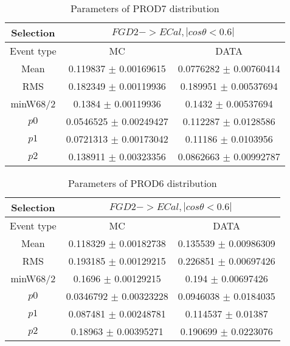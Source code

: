 \documentclass[a4paper,12pt]{article}
\begin{document}
\begin{table}[htbp]
\begin{center}
\begin{tabular}{|c|c|c|}
        \hline
        Selection & \multicolumn{2}{|c|}{$FGD2->ECal, |cos\theta<0.6|$}  \\ \hline
        Event type & MC & DATA \\ 
        \hline
        Mean & 0.119837 $\pm$ 0.00169615 & 0.0776282 $\pm$ 0.00760414 \\ 
        \hline 
        RMS & 0.182349 $\pm$ 0.00119936 & 0.189951 $\pm$ 0.00537694 \\ 
        \hline 
        minW68/2 & 0.1384 $\pm$ 0.00119936 & 0.1432 $\pm$ 0.00537694 \\ 
        \hline 
        $p0$ & 0.0546525 $\pm$ 0.00249427 & 0.112287 $\pm$ 0.0128586 \\ 
        \hline 
        $p1$ & 0.0721313 $\pm$ 0.00173042 & 0.11186 $\pm$ 0.0103956 \\ 
        \hline 
        $p2$ & 0.138911 $\pm$ 0.00323356 & 0.0862663 $\pm$ 0.00992787 \\ 
        \hline 
\end{tabular}
\caption{Parameters of PROD7 distribution } \vspace{0.2in}
\label{xxx}
\end{center}
\end{table}
\begin{table}[htbp]
\begin{center}
\begin{tabular}{|c|c|c|}
        \hline
        Selection & \multicolumn{2}{|c|}{$FGD2->ECal, |cos\theta<0.6|$}  \\ \hline
        Event type & MC & DATA \\ 
        \hline
        Mean & 0.118329 $\pm$ 0.00182738 & 0.135539 $\pm$ 0.00986309 \\ 
        \hline 
        RMS & 0.193185 $\pm$ 0.00129215 & 0.226851 $\pm$ 0.00697426 \\ 
        \hline 
        minW68/2 & 0.1696 $\pm$ 0.00129215 & 0.194 $\pm$ 0.00697426 \\ 
        \hline 
        $p0$ & 0.0346792 $\pm$ 0.00323228 & 0.0946038 $\pm$ 0.0184035 \\ 
        \hline 
        $p1$ & 0.087481 $\pm$ 0.00248781 & 0.114537 $\pm$ 0.01387 \\ 
        \hline 
        $p2$ & 0.18963 $\pm$ 0.00395271 & 0.190699 $\pm$ 0.0223076 \\ 
        \hline 
\end{tabular}
\caption{Parameters of PROD6 distribution } \vspace{0.2in}
\label{xxx}
\end{center}
\end{table}
\end{document}
